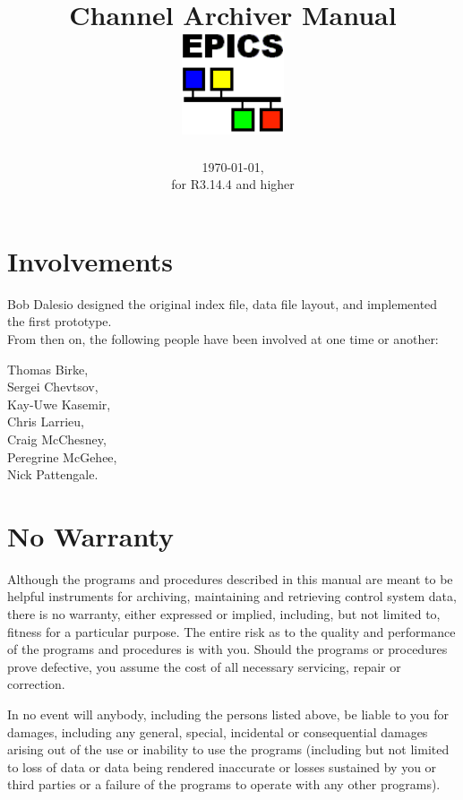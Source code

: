 \documentclass{report}
\begin{document}
\sffamily
\title{\Huge Channel Archiver Manual\\[1cm]
\includegraphics[width=3cm]{logo101}
}
\date{\today,\\ for R3.14.4 and higher}
\maketitle
\newpage

\pagestyle{empty}

\section*{Involvements}
Bob Dalesio designed the original index file, data file layout,
and implemented the first prototype.\\
From then on, the following people have been involved at one
time or another:\\
\begin{center}
Thomas Birke,\\
Sergei Chevtsov,\\
Kay-Uwe Kasemir,\\ 
Chris Larrieu,\\
Craig McChesney,\\
Peregrine McGehee,\\
Nick Pattengale.
\end{center}

\section*{No Warranty}
Although the programs and procedures described in this manual are
meant to be helpful instruments for archiving, maintaining and
retrieving control system data, there is no warranty, either expressed
or implied, including, but not limited to, fitness for a particular
purpose. The entire risk as to the quality and performance of the
programs and procedures is with you.  Should the programs or
procedures prove defective, you assume the cost of all necessary
servicing, repair or correction.

In no event will anybody, including the persons listed above, be
liable to you for damages, including any general, special, incidental
or consequential damages arising out of the use or inability to use
the programs (including but not limited to loss of data or data being
rendered inaccurate or losses sustained by you or third parties or a
failure of the programs to operate with any other programs).
\end{document}
